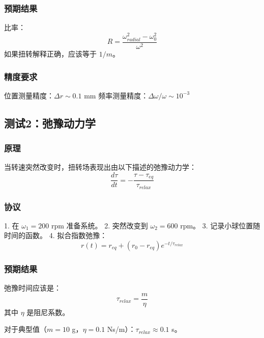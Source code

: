\documentclass[12pt,a4paper]{article}
\begin{document}
\subsubsection{预期结果}

比率：
\begin{equation}
    R = \frac{\omega_{radial}^2 - \omega_0^2}{\omega^2}
\end{equation}
如果扭转解释正确，应该等于 $1/m$。

\subsubsection{精度要求}

位置测量精度：$\Delta r \sim 0.1$ mm  
频率测量精度：$\Delta\omega/\omega \sim 10^{-3}$

\subsection{测试2：弛豫动力学}

\subsubsection{原理}

当转速突然改变时，扭转场表现出由以下描述的弛豫动力学：
\begin{equation}
    \frac{d\tau}{dt} = -\frac{\tau - \tau_{eq}}{\tau_{relax}}
\end{equation}

\subsubsection{协议}

1. 在 $\omega_1 = 200$ rpm 准备系统。
2. 突然改变到 $\omega_2 = 600$ rpm。
3. 记录小球位置随时间的函数。
4. 拟合指数弛豫：
\begin{equation}
    r(t) = r_{eq} + (r_0 - r_{eq})e^{-t/\tau_{relax}}
\end{equation}

\subsubsection{预期结果}

弛豫时间应该是：
\begin{equation}
    \tau_{relax} = \frac{m}{\eta}
\end{equation}
其中 $\eta$ 是阻尼系数。

对于典型值（$m = 10$ g，$\eta = 0.1$ Ns/m）：$\tau_{relax} \approx 0.1$ s。
\end{document}
